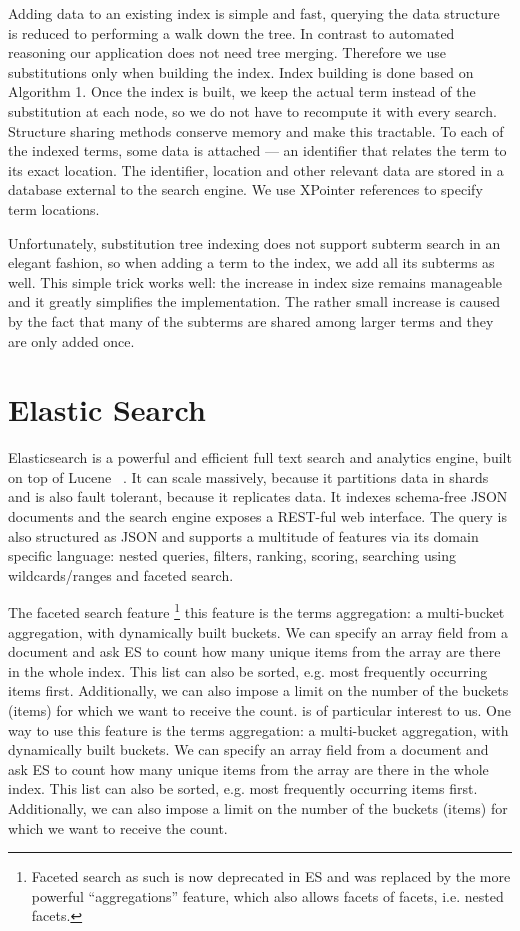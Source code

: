\documentclass{deliverablereport}
\begin{document}
Adding data to an existing index is simple and fast, querying the data structure is
reduced to performing a walk down the tree. In contrast to automated reasoning our
application does not need tree merging. Therefore we use substitutions only when building
the index. Index building is done based on Algorithm 1. Once the index is built, we keep
the actual term instead of the substitution at each node, so we do not have to recompute
it with every search. Structure sharing methods conserve memory and make this
tractable. To each of the indexed terms, some data is attached — an identifier that
relates the term to its exact location. The identifier, location and other relevant data
are stored in a database external to the search engine. We use XPointer references to
specify term locations.

Unfortunately, substitution tree indexing does not support subterm search in an elegant
fashion, so when adding a term to the index, we add all its subterms as well. This simple
trick works well: the increase in index size remains manageable and it greatly simplifies
the implementation. The rather small increase is caused by the fact that many of the
subterms are shared among larger terms and they are only added once.

\section{Elastic Search}\label{sec:elastic}
Elasticsearch is a powerful and efficient full text search and analytics engine, built on
top of Lucene ~\cite{Elastic}. It can scale massively, because it partitions data in shards and is also
fault tolerant, because it replicates data. It indexes schema-free JSON documents and the
search engine exposes a REST-ful web interface. The query is also structured as JSON and
supports a multitude of features via its domain specific language: nested queries,
filters, ranking, scoring, searching using wildcards/ranges and faceted search.

The faceted search feature \footnote{Faceted search as such is now deprecated in ES and
  was replaced by the more powerful “aggregations” feature, which also allows facets of
  facets, i.e. nested facets.} this feature is the terms aggregation: a multi-bucket
aggregation, with dynamically built buckets. We can specify an array field from a document
and ask ES to count how many unique items from the array are there in the whole
index. This list can also be sorted, e.g. most frequently occurring items
first. Additionally, we can also impose a limit on the number of the buckets (items) for
which we want to receive the count. is of particular interest to us. One way to use this
feature is the terms aggregation: a multi-bucket aggregation, with dynamically built
buckets. We can specify an array field from a document and ask ES to count how many unique
items from the array are there in the whole index. This list can also be sorted, e.g. most
frequently occurring items first. Additionally, we can also impose a limit on the number
of the buckets (items) for which we want to receive the count.
\end{document}
